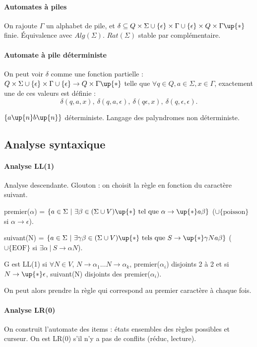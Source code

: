 \documentclass[french]{article}
\begin{document}
\paragraph{Automates à piles}
On rajoute $\Gamma$ un alphabet de pile, et $\delta\subseteq Q\times\Sigma\cup\{\epsilon\}\times\Gamma\cup\{\epsilon\}\times Q\times\Gamma\up{*}$ finie. Équivalence avec $Alg(\Sigma)$. $Rat(\Sigma)$ stable par complémentaire.

\paragraph{Automate à pile déterministe}
On peut voir $\delta$ comme une fonction partielle : $Q\times\Sigma\cup\{\epsilon\}\times\Gamma\cup\{\epsilon\}\rightarrow Q\times\Gamma\up{*}$ telle que $\forall q\in Q, a\in\Sigma, x\in\Gamma$, exactement une de ces valeurs est définie : $$\delta(q,a,x),\ \delta(q,a,\epsilon),\ \delta(q\epsilon,x),\ \delta(q,\epsilon,\epsilon).$$

$\{a\up{n}b\up{n}\}$ déterministe. Langage des palyndromes non déterministe.

\subsection{Analyse syntaxique}
\paragraph{Analyse LL(1)}
Analyse descendante. Glouton : on choisit la règle en fonction du caractère suivant. 

premier($\alpha$) = $\{a\in\Sigma~|~\exists\beta\in(\Sigma\cup V)\up{*}\text{ tel que }\alpha\rightarrow\up{*}a\beta\}$ ($\cup\{\text{poisson}\}$ si $\alpha\rightarrow\epsilon$).

suivant(N) = $\{a\in\Sigma~|~\exists\gamma\beta\in(\Sigma\cup V)\up{*}\text{ tels que }S\rightarrow\up{*}\gamma Na\beta\}$ ($\cup\{\text{EOF}\}$ si $\exists\alpha~|~S\rightarrow\alpha N$).

G est LL(1) si $\forall N\in V$, $N\rightarrow\alpha_1\dots N\rightarrow\alpha_k$, premier($\alpha_i$) disjoints 2 à 2 et si $N\rightarrow\up{*}\epsilon$, suivant(N) disjoints des premier($\alpha_i)$.

On peut alors prendre la règle qui correspond au premier caractère à chaque fois.


\paragraph{Analyse LR(0)}
On construit l'automate des items : états ensembles des règles possibles et curseur. On est LR(0) s'il n'y a pas de conflits (réduc, lecture).
\end{document}
